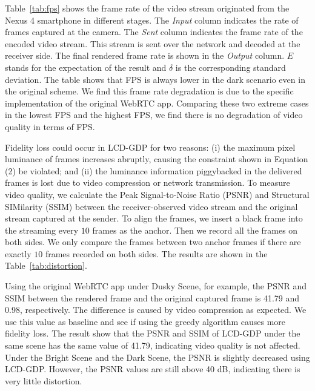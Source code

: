 Table~\ref{tab:fps} shows the frame rate of the video stream originated from the Nexus 4 smartphone 
in different stages. The {\it Input} column indicates the rate of frames captured at the camera. 
The {\it Sent} column indicates the frame rate of the encoded video stream.
This stream is sent over the network and decoded at the receiver side.
The final rendered frame rate is shown in the {\it Output} column. 
$E$ stands for the
expectation of the result and $\delta$ is the corresponding standard
deviation. The table shows that FPS is always lower in the dark scenario
even in the original scheme. We find this frame rate degradation
is due to the specific implementation of the original WebRTC app. Comparing these two
extreme cases in the lowest FPS and the highest FPS,  we find there is no degradation of video quality in terms of FPS.

Fidelity loss could occur in LCD-GDP for two reasons: (i) the maximum pixel luminance of 
frames increases abruptly, causing the constraint shown in Equation (2) be violated;
and (ii) the luminance information piggybacked in the delivered frames is lost due to video
compression or network transmission.
To measure video quality, we calculate the Peak
Signal-to-Noise Ratio (PSNR) and Structural SIMilarity (SSIM) 
between the receiver-observed video stream and the original stream captured at the sender. 
To align the frames, we insert a black frame into the streaming every $10$ 
frames as the anchor. Then we record all the frames on both sides. 
We only compare the frames between two anchor frames if there 
are exactly $10$ frames recorded on both sides. 
The results are shown in the Table~\ref{tab:distortion}.

Using the original WebRTC app under Dusky Scene, for example, the PSNR and SSIM between 
the rendered frame and the original captured frame is 41.79 and 0.98, respectively. 
The difference is caused by video compression as expected. We use this value as baseline
and see if using the greedy algorithm causes more fidelity loss. 
The result show that the PSNR and SSIM of LCD-GDP under the same scene has the same
value of 41.79, indicating video quality is not affected.
Under the Bright Scene and the Dark Scene, the PSNR is slightly decreased using LCD-GDP.
However, the PSNR values are still above 40 dB, indicating there is very little distortion.

